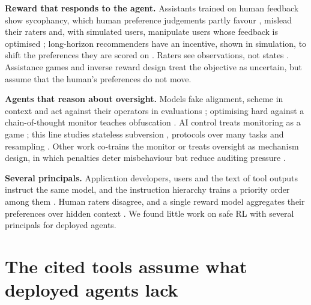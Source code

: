 \documentclass{article}
\begin{document}
\textbf{Reward that responds to the agent.} Assistants trained on human feedback show sycophancy, which human preference judgements partly favour \citep{sharma2024}, mislead their raters \citep{wen2024a} and, with simulated users, manipulate users whose feedback is optimised \citep{williams2024}; long-horizon recommenders have an incentive, shown in simulation, to shift the preferences they are scored on \citep{carroll2022}. Raters see observations, not states \citep{lang2024}. Assistance games \citep{hadfieldmenell2016} and inverse reward design \citep{hadfieldmenell2017} treat the objective as uncertain, but assume that the human's preferences do not move.

\textbf{Agents that reason about oversight.} Models fake alignment, scheme in context and act against their operators in evaluations \citep{greenblatt2024b, meinke2024, lynch2025}; optimising hard against a chain-of-thought monitor teaches obfuscation \citep{baker2025}. AI control treats monitoring as a game \citep{greenblatt2024a, griffin2024}; this line studies stateless subversion \citep{mallen2024}, protocols over many tasks \citep{wen2024b} and resampling \citep{bhatt2025}. Other work co-trains the monitor \citep{li2026} or treats oversight as mechanism design, in which penalties deter misbehaviour but reduce auditing pressure \citep{agarwal2026}.

\textbf{Several principals.} Application developers, users and the text of tool outputs instruct the same model, and the instruction hierarchy trains a priority order among them \citep{wallace2024}. Human raters disagree, and a single reward model aggregates their preferences over hidden context \citep{siththaranjan2024, conitzer2024}. We found little work on safe RL with several principals for deployed agents.

\hypertarget{sec:conditions}{%
\section{The cited tools assume what deployed agents lack}\label{sec:conditions}}
\end{document}
